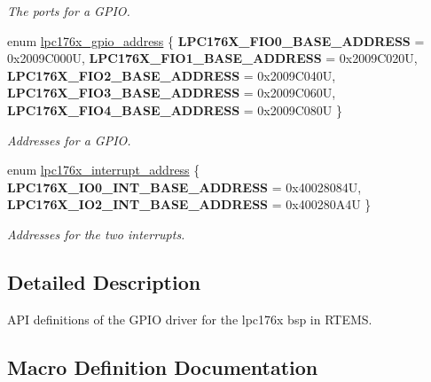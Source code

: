 \begin{DoxyCompactItemize}
\begin{DoxyCompactList}\small\item\em The ports for a G\+P\+IO. \end{DoxyCompactList}\item 
enum \mbox{\hyperlink{gpio-defs_8h_aed5f40540b16f2964d5ec99ad21525b7}{lpc176x\+\_\+gpio\+\_\+address}} \{ \newline
{\bfseries L\+P\+C176\+X\+\_\+\+F\+I\+O0\+\_\+\+B\+A\+S\+E\+\_\+\+A\+D\+D\+R\+E\+SS} = 0x2009\+C000U, 
{\bfseries L\+P\+C176\+X\+\_\+\+F\+I\+O1\+\_\+\+B\+A\+S\+E\+\_\+\+A\+D\+D\+R\+E\+SS} = 0x2009\+C020U, 
{\bfseries L\+P\+C176\+X\+\_\+\+F\+I\+O2\+\_\+\+B\+A\+S\+E\+\_\+\+A\+D\+D\+R\+E\+SS} = 0x2009\+C040U, 
{\bfseries L\+P\+C176\+X\+\_\+\+F\+I\+O3\+\_\+\+B\+A\+S\+E\+\_\+\+A\+D\+D\+R\+E\+SS} = 0x2009\+C060U, 
\newline
{\bfseries L\+P\+C176\+X\+\_\+\+F\+I\+O4\+\_\+\+B\+A\+S\+E\+\_\+\+A\+D\+D\+R\+E\+SS} = 0x2009\+C080U
 \}
\begin{DoxyCompactList}\small\item\em Addresses for a G\+P\+IO. \end{DoxyCompactList}\item 
enum \mbox{\hyperlink{gpio-defs_8h_acaa78f884cdd1863f772751af679e3e7}{lpc176x\+\_\+interrupt\+\_\+address}} \{ {\bfseries L\+P\+C176\+X\+\_\+\+I\+O0\+\_\+\+I\+N\+T\+\_\+\+B\+A\+S\+E\+\_\+\+A\+D\+D\+R\+E\+SS} = 0x40028084U, 
{\bfseries L\+P\+C176\+X\+\_\+\+I\+O2\+\_\+\+I\+N\+T\+\_\+\+B\+A\+S\+E\+\_\+\+A\+D\+D\+R\+E\+SS} = 0x400280\+A4U
 \}
\begin{DoxyCompactList}\small\item\em Addresses for the two interrupts. \end{DoxyCompactList}\end{DoxyCompactItemize}


\subsection{Detailed Description}
A\+PI definitions of the G\+P\+IO driver for the lpc176x bsp in R\+T\+E\+MS. 



\subsection{Macro Definition Documentation}
\mbox{\label{gpio-defs_8h_a5bcbef66df34033e6fb8b35a430c65a1}} 

